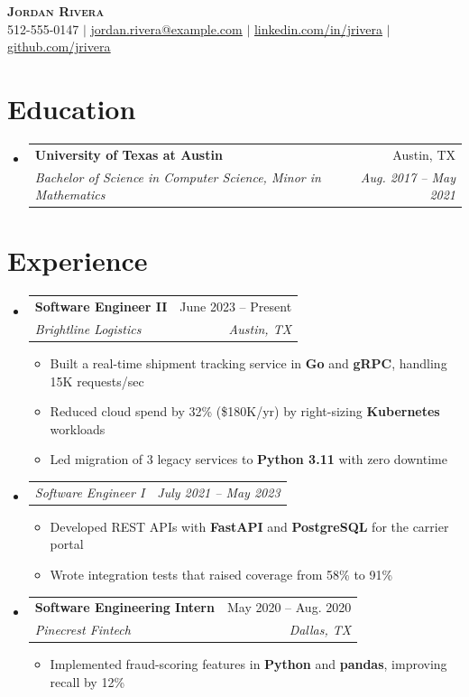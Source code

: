 \documentclass[letterpaper,11pt]{article}
\makeatletter
\newcommand{\resumeItem}[1]{
  \item\small{
    {#1 \vspace{-2pt}}
  }
}
\newcommand{\resumeSubheading}[4]{
  \vspace{-2pt}\item
    \begin{tabular*}{0.97\textwidth}[t]{l@{\extracolsep{\fill}}r}
      \textbf{#1} & #2 \\
      \textit{\small#3} & \textit{\small #4} \\
    \end{tabular*}\vspace{-7pt}
}
\newcommand{\resumeSubSubheading}[2]{
    \item
    \begin{tabular*}{0.97\textwidth}{l@{\extracolsep{\fill}}r}
      \textit{\small#1} & \textit{\small #2} \\
    \end{tabular*}\vspace{-7pt}
}
\newcommand{\resumeSubHeadingListStart}{\begin{itemize}[leftmargin=0.15in, label={}]}
\newcommand{\resumeSubHeadingListEnd}{\end{itemize}}
\newcommand{\resumeItemListStart}{\begin{itemize}}
\newcommand{\resumeItemListEnd}{\end{itemize}\vspace{-5pt}}
\makeatother
\begin{document}
\begin{center}
    \textbf{\Huge \scshape Jordan Rivera} \\ \vspace{1pt}
    \small 512-555-0147 $|$ \href{mailto:jordan.rivera@example.com}{\underline{jordan.rivera@example.com}} $|$
    \href{https://linkedin.com/in/jrivera}{\underline{linkedin.com/in/jrivera}} $|$
    \href{https://github.com/jrivera}{\underline{github.com/jrivera}}
\end{center}


\section{Education}
  \resumeSubHeadingListStart
    \resumeSubheading
      {University of Texas at Austin}{Austin, TX}
      {Bachelor of Science in Computer Science, Minor in Mathematics}{Aug. 2017 -- May 2021}
  \resumeSubHeadingListEnd


\section{Experience}
  \resumeSubHeadingListStart

    \resumeSubheading
      {Software Engineer II}{June 2023 -- Present}
      {Brightline Logistics}{Austin, TX}
      \resumeItemListStart
        \resumeItem{Built a real-time shipment tracking service in \textbf{Go} and \textbf{gRPC}, handling 15K requests/sec}
        \resumeItem{Reduced cloud spend by 32\% (\$180K/yr) by right-sizing \textbf{Kubernetes} workloads}
        \resumeItem{Led migration of 3 legacy services to \textbf{Python 3.11} with zero downtime}
      \resumeItemListEnd

    \resumeSubSubheading
      {Software Engineer I}{July 2021 -- May 2023}
      \resumeItemListStart
        \resumeItem{Developed REST APIs with \textbf{FastAPI} and \textbf{PostgreSQL} for the carrier portal}
        \resumeItem{Wrote integration tests that raised coverage from 58\% to 91\%}
      \resumeItemListEnd

    \resumeSubheading
      {Software Engineering Intern}{May 2020 -- Aug. 2020}
      {Pinecrest Fintech}{Dallas, TX}
      \resumeItemListStart
        \resumeItem{Implemented fraud-scoring features in \textbf{Python} and \textbf{pandas}, improving recall by 12\%}
      \resumeItemListEnd

  \resumeSubHeadingListEnd
\end{document}
